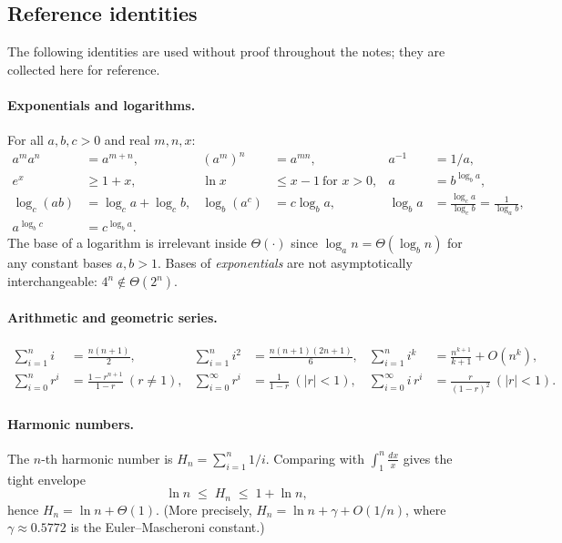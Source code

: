 \subsection{Reference identities}

The following identities are used without proof throughout the notes; they are collected here for reference.

\paragraph{Exponentials and logarithms.} For all $a, b, c > 0$ and real $m, n, x$:
\begin{align*}
  a^m a^n &= a^{m+n}, & (a^m)^n &= a^{mn}, & a^{-1} &= 1/a, \\
  e^x &\ge 1 + x, & \ln x &\le x - 1\ \text{for } x > 0, & a &= b^{\log_b a}, \\
  \log_c(ab) &= \log_c a + \log_c b, & \log_b(a^c) &= c\log_b a, & \log_b a &= \frac{\log_c a}{\log_c b} = \frac{1}{\log_a b}, \\
  a^{\log_b c} &= c^{\log_b a}.
\end{align*}
The base of a logarithm is irrelevant inside $\Theta(\cdot)$ since $\log_a n = \Theta(\log_b n)$ for any constant bases $a, b > 1$. Bases of \emph{exponentials} are not asymptotically interchangeable: $4^n \notin \Theta(2^n)$.

\paragraph{Arithmetic and geometric series.}
\begin{align*}
  \sum_{i=1}^{n} i &= \frac{n(n+1)}{2}, &
  \sum_{i=1}^{n} i^2 &= \frac{n(n+1)(2n+1)}{6}, &
  \sum_{i=1}^{n} i^k &= \frac{n^{k+1}}{k+1} + O(n^k), \\
  \sum_{i=0}^{n} r^i &= \frac{1 - r^{n+1}}{1 - r}\ (r \ne 1), &
  \sum_{i=0}^{\infty} r^i &= \frac{1}{1 - r}\ (|r| < 1), &
  \sum_{i=0}^{\infty} i\, r^i &= \frac{r}{(1-r)^2}\ (|r| < 1).
\end{align*}

\paragraph{Harmonic numbers.} The $n$-th harmonic number is $H_n = \sum_{i=1}^{n} 1/i$. Comparing with $\int_1^n \frac{dx}{x}$ gives the tight envelope
\[
  \ln n \;\le\; H_n \;\le\; 1 + \ln n,
\]
hence $H_n = \ln n + \Theta(1)$. (More precisely, $H_n = \ln n + \gamma + O(1/n)$, where $\gamma \approx 0.5772$ is the Euler--Mascheroni constant.)

